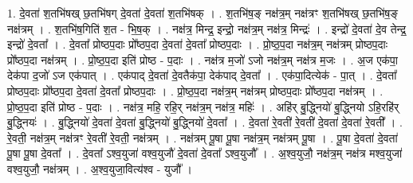 \documentclass[17pt]{extarticle}
\begin{document}
1. दे॒वता॑ श॒तभि॑षख् छ॒तभि॑षग् दे॒वता॑ दे॒वता॑ श॒तभि॑षक् । . श॒तभि॑ष॒ङ् नक्ष॑त्र॒म् नक्ष॑त्रꣳ श॒तभि॑षख् छ॒तभि॑ष॒ङ् नक्ष॑त्रम् । . श॒तभि॑ष॒गिति॑ श॒त - भि॒ष॒क् । . नक्ष॑त्र॒ मिन्द्र॒ इन्द्रो॒ नक्ष॑त्र॒म् नक्ष॑त्र॒ मिन्द्रः॑ । . इन्द्रो॑ दे॒वता॑ दे॒व तेन्द्र॒ इन्द्रो॑ दे॒वता᳚ । . दे॒वता᳚ प्रोष्ठप॒दाः प्रो᳚ष्ठप॒दा दे॒वता॑ दे॒वता᳚ प्रोष्ठप॒दाः । . प्रो॒ष्ठ॒प॒दा नक्ष॑त्र॒म् नक्ष॑त्रम् प्रोष्ठप॒दाः प्रो᳚ष्ठप॒दा नक्ष॑त्रम् । . प्रो॒ष्ठ॒प॒दा इति॑ प्रोष्ठ - प॒दाः । . नक्ष॑त्र म॒जो॑ ऽजो नक्ष॑त्र॒म् नक्ष॑त्र म॒जः । . अ॒ज एक॑पा॒ देक॑पा द॒जो॑ ऽज एक॑पात् । . एक॑पाद् दे॒वता॑ दे॒वतैक॑पा॒ देक॑पाद् दे॒वता᳚ । . एक॑पा॒दित्येक॑ - पा॒त् । . दे॒वता᳚ प्रोष्ठप॒दाः प्रो᳚ष्ठप॒दा दे॒वता॑ दे॒वता᳚ प्रोष्ठप॒दाः । . प्रो॒ष्ठ॒प॒दा नक्ष॑त्र॒म् नक्ष॑त्रम् प्रोष्ठप॒दाः प्रो᳚ष्ठप॒दा नक्ष॑त्रम् । . प्रो॒ष्ठ॒प॒दा इति॑ प्रोष्ठ - प॒दाः । . नक्ष॑त्र॒ महि॒ रहि॒र् नक्ष॑त्र॒म् नक्ष॑त्र॒ महिः॑ । . अहि॑र् बु॒द्ध्नियो॑ बु॒द्ध्नियो ऽहि॒रहि॑र् बु॒द्ध्नियः॑ । . बु॒द्ध्नियो॑ दे॒वता॑ दे॒वता॑ बु॒द्ध्नियो॑ बु॒द्ध्नियो॑ दे॒वता᳚ । . दे॒वता॑ रे॒वती॑ रे॒वती॑ दे॒वता॑ दे॒वता॑ रे॒वती᳚ । . रे॒वती॒ नक्ष॑त्र॒म् नक्ष॑त्रꣳ रे॒वती॑ रे॒वती॒ नक्ष॑त्रम् । . नक्ष॑त्रम् पू॒षा पू॒षा नक्ष॑त्र॒म् नक्ष॑त्रम् पू॒षा । . पू॒षा दे॒वता॑ दे॒वता॑ पू॒षा पू॒षा दे॒वता᳚ । . दे॒वता᳚ ऽश्व॒युजा॑ वश्व॒युजौ॑ दे॒वता॑ दे॒वता᳚ ऽश्व॒युजौ᳚ । . अ॒श्व॒युजौ॒ नक्ष॑त्र॒म् नक्ष॑त्र मश्व॒युजा॑ वश्व॒युजौ॒ नक्ष॑त्रम् । . अ॒श्व॒युजा॒वित्य॑श्व - युजौ᳚ । \newline
\end{document}
